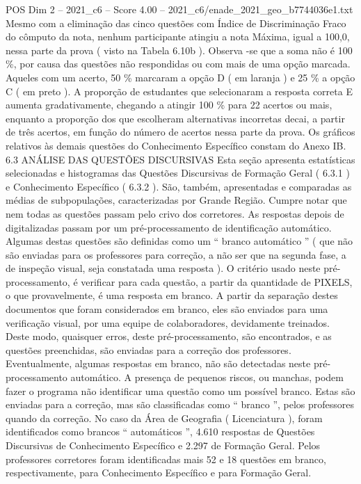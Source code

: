 \begin{textsample}{POS Dim 2 – 2021\_c6 – Score 4.00 – 2021\_c6/enade\_2021\_geo\_b7744036e1.txt}
Mesmo com a eliminação das cinco questões com Índice de Discriminação Fraco do cômputo da nota, nenhum participante atingiu a nota Máxima, igual a 100,0, nessa parte da prova ( visto na Tabela 6.10b ).
Observa -se que a soma não é 100 \%, por causa das questões não respondidas ou com mais de uma opção marcada.
Aqueles com um acerto, 50 \% marcaram a opção D ( em laranja ) e 25 \% a opção C ( em preto ).
A proporção de estudantes que selecionaram a resposta correta E aumenta gradativamente, chegando a atingir 100 \% para 22 acertos ou mais, enquanto a proporção dos que escolheram alternativas incorretas decai, a partir de três acertos, em função do número de acertos nessa parte da prova.
Os gráficos relativos às demais questões do Conhecimento Específico constam do Anexo IB. 6.3 ANÁLISE DAS QUESTÕES DISCURSIVAS Esta seção apresenta estatísticas selecionadas e histogramas das Questões Discursivas de Formação Geral ( 6.3.1 ) e Conhecimento Específico ( 6.3.2 ).
São, também, apresentadas e comparadas as médias de subpopulações, caracterizadas por Grande Região.
Cumpre notar que nem todas as questões passam pelo crivo dos corretores.
As respostas depois de digitalizadas passam por um pré-processamento de identificação automático.
Algumas destas questões são definidas como um “ branco automático ” ( que não são enviadas para os professores para correção, a não ser que na segunda fase, a de inspeção visual, seja constatada uma resposta ).
O critério usado neste pré-processamento, é verificar para cada questão, a partir da quantidade de PIXELS, o que provavelmente, é uma resposta em branco.
A partir da separação destes documentos que foram considerados em branco, eles são enviados para uma verificação visual, por uma equipe de colaboradores, devidamente treinados.
Deste modo, quaisquer erros, deste pré-processamento, são encontrados, e as questões preenchidas, são enviadas para a correção dos professores.
Eventualmente, algumas respostas em branco, não são detectadas neste pré-processamento automático.
A presença de pequenos riscos, ou manchas, podem fazer o programa não identificar uma questão como um possível branco.
Estas são enviadas para a correção, mas são classificadas como “ branco ”, pelos professores quando da correção.
No caso da Área de Geografia ( Licenciatura ), foram identificados como brancos “ automáticos ”, 4.610 respostas de Questões Discursivas de Conhecimento Específico e 2.297 de Formação Geral.
Pelos professores corretores foram identificadas mais 52 e 18 questões em branco, respectivamente, para Conhecimento Específico e para Formação Geral.

\end{textsample}
